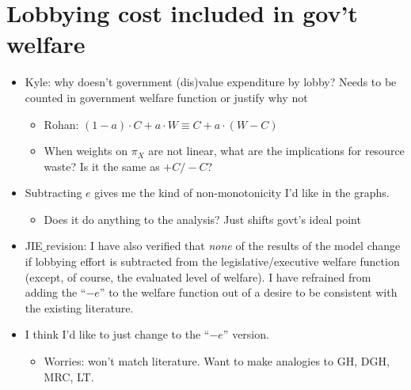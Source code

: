 \documentclass[12pt]{article}
\begin{document}
\section{Lobbying cost included in gov't welfare}
	\begin{itemize}
		\item Kyle: why doesn't government (dis)value expenditure by lobby? Needs to be counted in government welfare function or justify why not
			\begin{itemize}
				\item Rohan: $(1-a)\cdot C + a \cdot W \equiv C + a \cdot (W-C)$
				\item When weights on $\pi_X$ are not linear, what are the implications for resource waste? Is it the same as $+ C / - C$?
			\end{itemize}
		\item Subtracting $e$ gives me the kind of non-monotonicity I'd like in the graphs.
			\begin{itemize}
				\item Does it do anything to the analysis? Just shifts govt's ideal point
			\end{itemize}
		\item JIE$\_$revision: I have also verified that \emph{none} of the results of the model change if lobbying effort is subtracted from the legislative/executive welfare function (except, of course, the evaluated level of welfare). I have refrained from adding the ``$-e$'' to the welfare function out of a desire to be consistent with the existing literature.
		\item I think I'd like to just change to the ``$-e$'' version.
			\begin{itemize}
				\item Worries: won't match literature. Want to make analogies to GH, DGH, MRC, LT.
			\end{itemize}
	\end{itemize}
\end{document}
